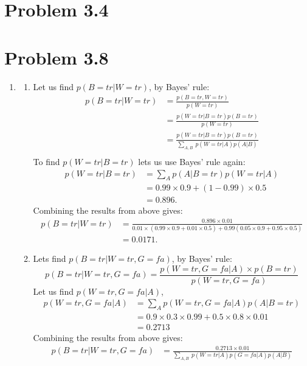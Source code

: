 \documentclass[11pt,a4paper,oneside]{report}
\begin{document}
\section*{Problem 3.4}


\section*{Problem 3.8}
\begin{enumerate}
	\item 
	\begin{enumerate}
		\item Let us find $p(B=tr|W=tr)$, by Bayes' rule:
		\begin{align}
		p(B=tr|W=tr) &= \frac{p(B = tr , W = tr)}{p(W =tr)} \\
		&= \frac{p(W = tr | B = tr)p(B = tr)}{p(W=tr)} \\
		&= \frac{p(W = tr | B = tr)p(B = tr)}{\sum_{A, B}~p(W = tr| A)p(A|B)}\\		
		\end{align}
	To find $p(W = tr | B = tr)$ lets us use Bayes' rule again:
	\begin{align}
	p(W = tr | B = tr) &= \sum_{A} p(A|B=tr)p(W = tr|A)\\
	&= 0.99\times0.9+(1-0.99)\times0.5\\
	&= 0.896.
	\end{align}
	Combining the results from above gives:
	\begin{align}
	p(B=tr|W=tr) &= \frac{0.896\times0.01}{0.01\times(0.99\times0.9+0.01\times 0.5)+0.99(0.05\times 0.9 + 0.95\times 0.5)}\\
	&= 0.0171.
	\end{align}
	\item
	Lets find $p(B=tr|W=tr,G=fa)$, by Bayes' rule:
	\begin{equation}
	p(B=tr|W=tr,G=fa) = \frac{p(W=tr, G=fa | A)\times p(B=tr)}{p(W=tr, G=fa)}
	\end{equation}
	Let us find $p(W=tr, G=fa | A)$,
	\begin{align}
	p(W=tr, G=fa | A) &= \sum_{A} p(W=tr, G=fa |A)p(A|B=tr)\\
	&=0.9 \times 0.3 \times 0.99+ 0.5\times 0.8 \times 0.01\\
	&= 0.2713
	\end{align}
	Combining the results from above gives:
	\begin{align}
	p(B=tr|W=tr,G=fa) &= \frac{0.2713 \times 0.01}{\sum_{A,B}~p(W=tr |A) p(G=fa|A) p(A|B)}\\

\end{align}
\end{enumerate}
\end{enumerate}
\end{document}
